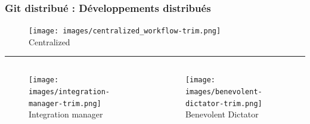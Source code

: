 \documentclass[table,tikz,12pt,svgnames]{beamer}
\begin{document}
\begin{frame}
\frametitle{Git distribué : Développements distribués}

\begin{figure}
	\centering
	\texttt{[image: images/centralized\_workflow-trim.png]}\\
	\small Centralized
\end{figure}

\PAUSE
\vspace{-1em}
\color{gray}\rule{\linewidth}{2pt}
\vspace{-0.5em}

\begin{adjustwidth}{-2cm}{-1cm}{}
	\begin{columns}[T] %
		\begin{column}{.5\textwidth}
			\begin{figure}
				\texttt{[image: images/integration-manager-trim.png]}
				\small {Integration manager}
			\end{figure}
		\end{column}%
		\begin{column}{.6\textwidth}
			\vspace{-0.8em}
			\begin{figure}
				\hfill%
				\texttt{[image: images/benevolent-dictator-trim.png]}
				Benevolent Dictator
			\end{figure}
		\end{column}%
	\end{columns}
\end{adjustwidth}
\end{frame}

\end{document}
